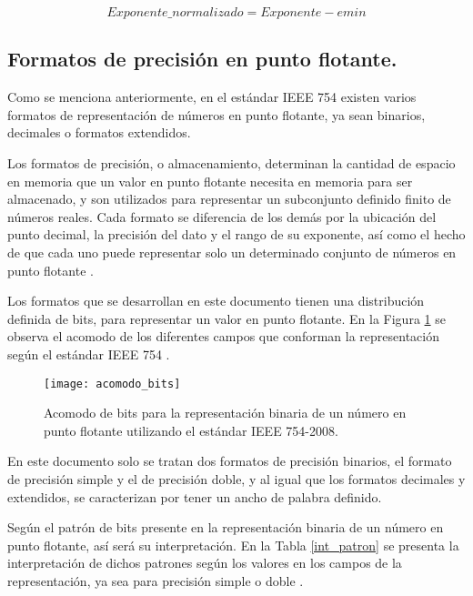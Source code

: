 \begin{equation}\label{eq:Ec_esp_norm}
Exponente\_normalizado = Exponente - emin
\end{equation}

\subsection{Formatos de precisión en punto flotante.}

Como se menciona anteriormente, en el estándar IEEE 754 existen varios formatos de representación de números en punto flotante, ya sean binarios, decimales o formatos extendidos.

Los formatos de precisión, o almacenamiento, determinan la cantidad de espacio en memoria que un valor en punto flotante necesita en memoria para ser almacenado, y son utilizados para representar un subconjunto definido finito de números reales. Cada formato se diferencia de los demás por la ubicación del punto decimal, la precisión del dato y el rango de su exponente, así como el hecho de que cada uno puede representar solo un determinado conjunto de números en punto flotante \cite{Tesis_Diego}.

Los formatos que se desarrollan en este documento tienen una distribución definida de bits, para representar un valor en punto flotante. En la Figura \ref{fig:acomodo_bits} se observa el acomodo de los diferentes campos que conforman la representación según el estándar IEEE 754 \cite{IEEE754}.


\begin{figure}[htb]
  \centering
  \texttt{[image: acomodo\_bits]}
  \caption{Acomodo de bits para la representación binaria de un número en punto flotante utilizando el estándar IEEE 754-2008.}
  \label{fig:acomodo_bits}
\end{figure}


En este documento solo se tratan dos formatos de precisión binarios, el formato de precisión simple y el de precisión doble, y al igual que los formatos decimales y extendidos, se caracterizan por tener un ancho de palabra definido.

Según el patrón de bits presente en la representación binaria de un número en punto flotante, así será su interpretación. En la Tabla \ref{int_patron} se presenta la interpretación de dichos patrones según los valores en los campos de la representación, ya sea para precisión simple o doble \cite{Tesis_Diego}.



